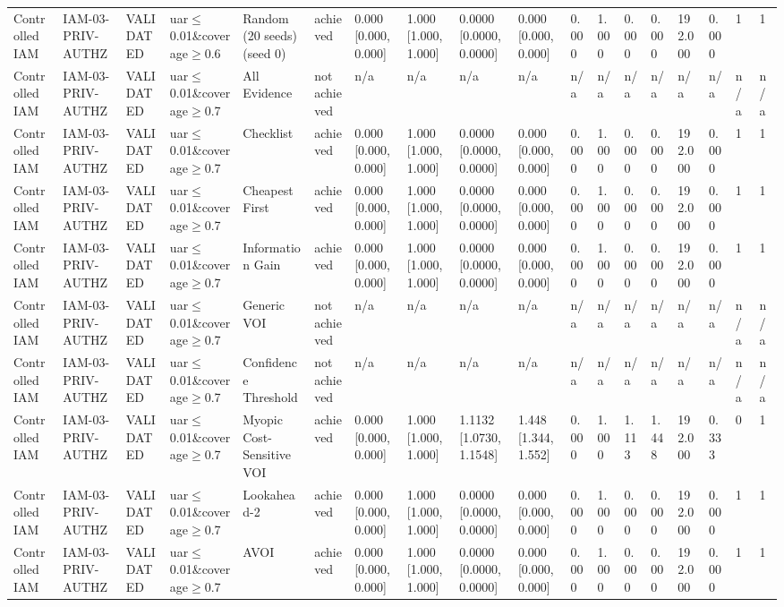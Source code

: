 \begin{table}[!ht]
{\begin{tabular}{llllllllllllllllll}
Controlled IAM & IAM-03-PRIV-AUTHZ & VALIDATED & uar$\le$0.01\&coverage$\ge$0.6 & Random (20 seeds) (seed 0) & achieved & 0.000 [0.000, 0.000] & 1.000 [1.000, 1.000] & 0.0000 [0.0000, 0.0000] & 0.000 [0.000, 0.000] & 0.000 & 1.000 & 0.000 & 0.000 & 192.000 & 0.000 & 1 & 1 \\
Controlled IAM & IAM-03-PRIV-AUTHZ & VALIDATED & uar$\le$0.01\&coverage$\ge$0.7 & All Evidence & not achieved & n/a & n/a & n/a & n/a & n/a & n/a & n/a & n/a & n/a & n/a & n/a & n/a \\
Controlled IAM & IAM-03-PRIV-AUTHZ & VALIDATED & uar$\le$0.01\&coverage$\ge$0.7 & Checklist & achieved & 0.000 [0.000, 0.000] & 1.000 [1.000, 1.000] & 0.0000 [0.0000, 0.0000] & 0.000 [0.000, 0.000] & 0.000 & 1.000 & 0.000 & 0.000 & 192.000 & 0.000 & 1 & 1 \\
Controlled IAM & IAM-03-PRIV-AUTHZ & VALIDATED & uar$\le$0.01\&coverage$\ge$0.7 & Cheapest First & achieved & 0.000 [0.000, 0.000] & 1.000 [1.000, 1.000] & 0.0000 [0.0000, 0.0000] & 0.000 [0.000, 0.000] & 0.000 & 1.000 & 0.000 & 0.000 & 192.000 & 0.000 & 1 & 1 \\
Controlled IAM & IAM-03-PRIV-AUTHZ & VALIDATED & uar$\le$0.01\&coverage$\ge$0.7 & Information Gain & achieved & 0.000 [0.000, 0.000] & 1.000 [1.000, 1.000] & 0.0000 [0.0000, 0.0000] & 0.000 [0.000, 0.000] & 0.000 & 1.000 & 0.000 & 0.000 & 192.000 & 0.000 & 1 & 1 \\
Controlled IAM & IAM-03-PRIV-AUTHZ & VALIDATED & uar$\le$0.01\&coverage$\ge$0.7 & Generic VOI & not achieved & n/a & n/a & n/a & n/a & n/a & n/a & n/a & n/a & n/a & n/a & n/a & n/a \\
Controlled IAM & IAM-03-PRIV-AUTHZ & VALIDATED & uar$\le$0.01\&coverage$\ge$0.7 & Confidence Threshold & not achieved & n/a & n/a & n/a & n/a & n/a & n/a & n/a & n/a & n/a & n/a & n/a & n/a \\
Controlled IAM & IAM-03-PRIV-AUTHZ & VALIDATED & uar$\le$0.01\&coverage$\ge$0.7 & Myopic Cost-Sensitive VOI & achieved & 0.000 [0.000, 0.000] & 1.000 [1.000, 1.000] & 1.1132 [1.0730, 1.1548] & 1.448 [1.344, 1.552] & 0.000 & 1.000 & 1.113 & 1.448 & 192.000 & 0.333 & 0 & 1 \\
Controlled IAM & IAM-03-PRIV-AUTHZ & VALIDATED & uar$\le$0.01\&coverage$\ge$0.7 & Lookahead-2 & achieved & 0.000 [0.000, 0.000] & 1.000 [1.000, 1.000] & 0.0000 [0.0000, 0.0000] & 0.000 [0.000, 0.000] & 0.000 & 1.000 & 0.000 & 0.000 & 192.000 & 0.000 & 1 & 1 \\
Controlled IAM & IAM-03-PRIV-AUTHZ & VALIDATED & uar$\le$0.01\&coverage$\ge$0.7 & AVOI & achieved & 0.000 [0.000, 0.000] & 1.000 [1.000, 1.000] & 0.0000 [0.0000, 0.0000] & 0.000 [0.000, 0.000] & 0.000 & 1.000 & 0.000 & 0.000 & 192.000 & 0.000 & 1 & 1 \\

\end{tabular}}
\end{table}
